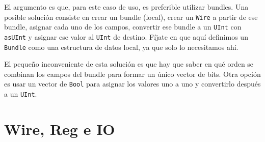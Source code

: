 \documentclass[%
    10pt,
    headinclude, footinclude=false,
    openright, %
    notitlepage,
    cleardoublepage=empty,
    headsepline,
    numbers=noenddot,
    bibliography=totoc, index=totoc,
    ]{scrbook}
\newcommand{\code}[1]{{\lstinline[basicstyle=\small\ttfamily]{#1}}}
\begin{document}


\noindent El argumento es que, para este caso de uso, es preferible utilizar bundles.
Una posible solución consiste en crear un bundle (local), crear un \code{Wire}
a partir de ese bundle, asignar cada uno de los campos, convertir ese bundle a un
\code{UInt} con \code{asUInt} y asignar ese valor al \code{UInt} de destino.
Fíjate en que aquí definimos un \code{Bundle} como una estructura de datos local, ya que solo
lo necesitamos ahí.



\noindent El pequeño inconveniente de esta solución es que hay que saber en qué orden se
combinan los campos del bundle para formar un único vector de bits. Otra opción es usar un vector de
\code{Bool} para asignar los valores uno a uno y convertirlo después a un \code{UInt}.


\section{Wire, Reg e IO}

\end{document}
